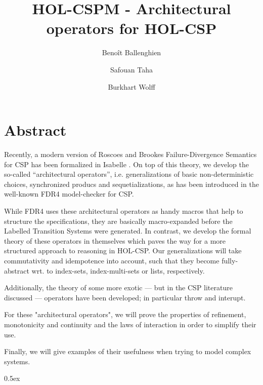 \documentclass[11pt,a4paper]{book}
\begin{document}
\title{HOL-CSPM - Architectural operators for HOL-CSP}
\author{Benoît Ballenghien \and Safouan Taha \and Burkhart Wolff}
\maketitle
\chapter*{Abstract}

   Recently, a modern version of Roscoes and Brookes \cite{brookes-roscoe85} 
   Failure-Divergence Semantics for CSP has been formalized in Isabelle \cite{HOL-CSP-AFP}. 
   On top of this theory, we develop the so-called ``architectural operators'', i.e.
   generalizations of basic non-deterministic choices, synchronized producs and sequetializations,
   as has been introduced in the well-known FDR4 model-checker for CSP.

   While FDR4 uses these architectural operators as handy macros that help to structure
   the specifications, they are basically macro-expanded before the Labelled Transition
   Systems were generated. In contrast, we develop the formal theory of these operators
   in themselves which paves the way for a more structured approach to reasoning 
   in HOL-CSP. Our generalizations will take commutativity and idempotence into account,
   such that they become fully-abstract wrt. to index-sets, index-multi-sets or lists, 
   respectively. 

   Additionally, the theory of some more exotic --- but in the CSP literature discussed --- 
   operators have been developed; in particular throw and interupt.

   For these "architectural operators", we will prove the properties of refinement,
   monotonicity and continuity and the laws of interaction in order to simplify their use.

   Finally, we will give examples of their usefulness when trying to model complex systems.

\tableofcontents

\parindent 0pt\parskip 0.5ex





\end{document}
